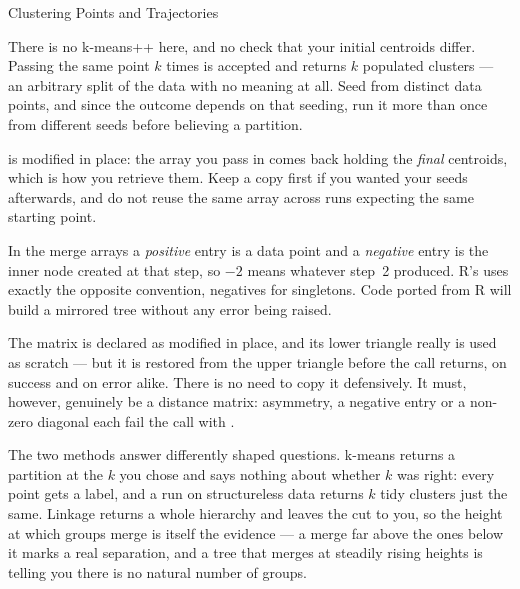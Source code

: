 \begin{recipe}[label=sub:clustering]{Clustering Points and Trajectories}
\begin{pitfall}
  There is no k-means++ here, and no check that your initial centroids differ.
  Passing the same point $k$ times is accepted and returns $k$ populated
  clusters --- an arbitrary split of the data with no meaning at all. Seed from
  distinct data points, and since the outcome depends on that seeding, run it
  more than once from different seeds before believing a partition.
\end{pitfall}

\begin{pitfall}
   is modified in place: the array you pass in comes back
  holding the \emph{final} centroids, which is how you retrieve them. Keep a
  copy first if you wanted your seeds afterwards, and do not reuse the same
  array across runs expecting the same starting point.
\end{pitfall}

\begin{pitfall}
  In the merge arrays a \emph{positive} entry is a data point and a
  \emph{negative} entry is the inner node created at that step, so $-2$ means
  whatever step~2 produced. R's  uses exactly the opposite
  convention, negatives for singletons. Code ported from R will build a
  mirrored tree without any error being raised.
\end{pitfall}

\begin{pitfall}
  The matrix is declared as modified in place, and its lower triangle really is
  used as scratch --- but it is restored from the upper triangle before the
  call returns, on success and on error alike. There is no need to copy it
  defensively. It must, however, genuinely be a distance matrix: asymmetry, a
  negative entry or a non-zero diagonal each fail the call with
  .
\end{pitfall}

\begin{interpretation}
  The two methods answer differently shaped questions. k-means returns a
  partition at the $k$ you chose and says nothing about whether $k$ was right:
  every point gets a label, and a run on structureless data returns $k$ tidy
  clusters just the same. Linkage returns a whole hierarchy and leaves the cut
  to you, so the height at which groups merge is itself the evidence --- a
  merge far above the ones below it marks a real separation, and a tree that
  merges at steadily rising heights is telling you there is no natural number
  of groups.


\end{interpretation}
\end{recipe}
